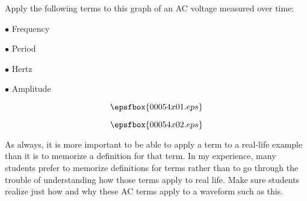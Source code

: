 

Apply the following terms to this graph of an AC voltage measured over time:

\medskip 
\item{$\bullet$} Frequency
\item{$\bullet$} Period
\item{$\bullet$} Hertz
\item{$\bullet$} Amplitude
\medskip 

$$\epsfbox{00054x01.eps}$$







$$\epsfbox{00054x02.eps}$$







As always, it is more important to be able to apply a term to a real-life example than it is to memorize a definition for that term.  In my experience, many students prefer to memorize definitions for terms rather than to go through the trouble of understanding how those terms apply to real life.  Make sure students realize just how and why these AC terms apply to a waveform such as this.




